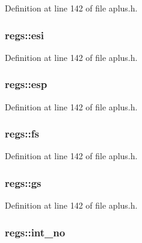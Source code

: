 Definition at line 142 of file aplus.\+h.

\hypertarget{structregs_a88723011f6b017490ee8bc7fc9a3235c}{
\subsubsection[{esi}]{ regs\+::esi}}\label{structregs_a88723011f6b017490ee8bc7fc9a3235c}


Definition at line 142 of file aplus.\+h.

\hypertarget{structregs_a7c44c0dc13f854e06e6cc509ba6e9054}{
\subsubsection[{esp}]{ regs\+::esp}}\label{structregs_a7c44c0dc13f854e06e6cc509ba6e9054}


Definition at line 142 of file aplus.\+h.

\hypertarget{structregs_a0974815767aa327833ce6beac16858d5}{
\subsubsection[{fs}]{ regs\+::fs}}\label{structregs_a0974815767aa327833ce6beac16858d5}


Definition at line 142 of file aplus.\+h.

\hypertarget{structregs_a0fd3992a1d7ba82600e1e03bf5466ce8}{
\subsubsection[{gs}]{ regs\+::gs}}\label{structregs_a0fd3992a1d7ba82600e1e03bf5466ce8}


Definition at line 142 of file aplus.\+h.

\hypertarget{structregs_ae15fe95c86d4f1c84d475f3d709286b5}{
\subsubsection[{int\+\_\+no}]{ regs\+::int\+\_\+no}}\label{structregs_ae15fe95c86d4f1c84d475f3d709286b5}


